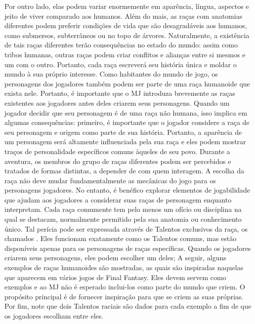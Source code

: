 Por outro lado, elas podem variar enormemente em aparência, língua, aspectos e jeito de viver comparado aos humanos.
Além do mais, as raças com anatomias diferentes podem preferir condições de vida que são desagradáveis aos humanos, como submersos, subterrâneos ou no topo de árvores.
Naturalmente, a existência de tais raças diferentes terão consequências no estado do mundo: assim como tribos humanas, outras raças podem criar conflitos e alianças entre si mesmos e um com o outro.
Portanto, cada raça escreverá seu história única e moldar o mundo à sua próprio interesse.
%
\newpage
%
\ofpar
%
Como habitantes do mundo de jogo, os personagens dos jogadores também podem ser parte de uma raça humanoide que exista nele.
Portanto, é importante que o MJ introduza brevemente as raças existentes aos jogadores antes deles criarem seus personagens.
Quando um jogador decidir que seu personagem é de uma raça não humana, isso implica em algumas consequências:
primeiro, é importante que o jogador considere a raça de seu personagem e origem como parte de sua história.
Portanto, a aparência de um personagem será altamente influenciada pela sua raça e eles podem mostrar traços de personalidade específicos comuns àqueles de seu povo.
Durante a aventura, os membros do grupo de raças diferentes podem ser percebidos e tratados de formas distintas, a depender de com quem interagem.
%
\vfill
%
A escolha da raça não deve mudar fundamentalmente as mecânicas do jogo para os personagens jogadores.
No entanto, é benéfico explorar elementos de jogabilidade que ajudam aos jogadores a considerar suas raças de personagem enquanto interpretam.
Cada raça comumente tem pelo menos um ofício ou disciplina na qual se destacam, normalmente permitido pela sua anatomia ou conhecimento único.
Tal perícia pode ser expressada através de Talentos exclusivos da raça, os chamados .
Eles funcionam exatamente como os Talentos comuns, mas estão disponíveis apenas para os personagens de raças específicas.
Quando os jogadores criarem seus personagens, eles podem escolher um deles;
A seguir, alguns exemplos de raças humanoides são mostradas, as quais são inspiradas naquelas que aparecem em vários jogos de Final Fantasy.
Eles devem servem como exemplos e ao MJ não é esperado inclui-los como parte do mundo que criem.
O propósito principal é de fornecer inspiração para que se criem as suas próprias.
Por fim, note que dois Talentos raciais são dados para cada exemplo a fim de que os jogadores escolham entre eles.
